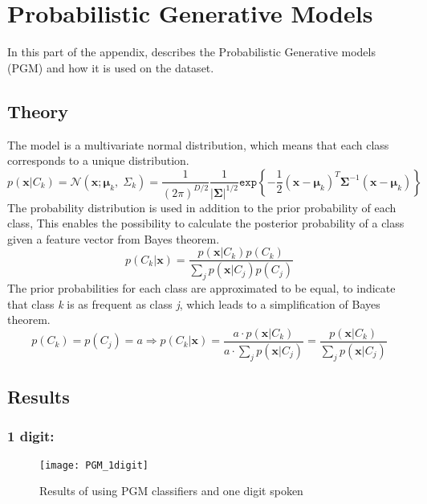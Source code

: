 \chapter{Probabilistic Generative Models}
In this part of the appendix, describes the Probabilistic Generative models (PGM) and how it is used on the dataset.

\section{Theory} 
The model is a multivariate normal distribution, which means that each class corresponds to a unique distribution.
\begin{equation}

p(\mathbf{x}|C_k)=\mathcal{N}(\mathbf{x};\mathbf{\mu}_k, \; \Sigma_k) = \dfrac{1}{(2\pi)^{D/2}} \dfrac{1}{\left|\mathbf{\Sigma} \right|^{1/2}} \mathtt{exp} \left\lbrace -\dfrac{1}{2} (\mathbf{x}-\mathbf{\mu}_k)^T \mathbf{\Sigma}^{-1} (\mathbf{x}-\mathbf{\mu}_k) \right\rbrace
\label{eq:gauss_dist} 
\end{equation}
The probability distribution is used in addition to the prior probability of each class, This enables the possibility to calculate the posterior probability of a class given a feature vector from Bayes theorem.
\begin{equation}
p(C_k |\mathbf{x}) = \dfrac{p(\mathbf{x}|C_k) p(C_k)}{\sum_j p(\mathbf{x}|C_j) p(C_j)}
\label{eq:posteriorP}
\end{equation}
The prior probabilities for each class are approximated to be equal, to indicate that class \textit{k} is as frequent as class \textit{j}, which leads to a simplification of Bayes theorem.
\begin{equation}
p(C_k) = p(C_j) = a \Longrightarrow p(C_k |\mathbf{x}) = \dfrac{a \cdot p(\mathbf{x}|C_k) }{a \cdot \sum_j p(\mathbf{x}|C_j) } = \dfrac{p(\mathbf{x}|C_k)}{\sum_j p(\mathbf{x}|C_j)}
\label{eq:posteriorPsimple}
\end{equation}

\section{Results}

\subsection{1 digit:}

\begin{figure}[H]
\centering
\texttt{[image: PGM\_1digit]}
\caption{Results of using PGM classifiers and one digit spoken}
\label{fig:PGM_1dig}
\end{figure}

